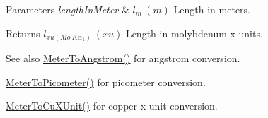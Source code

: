 \begin{DoxyParams}{Parameters}
{\em length\+In\+Meter} & $ l_{m}\ (m)$ Length in meters. \\
\hline
\end{DoxyParams}
\begin{DoxyReturn}{Returns}
$ l_{xu(Mo\ K\alpha_1)}\ (xu)$ Length in molybdenum x units. 
\end{DoxyReturn}
\begin{DoxySeeAlso}{See also}
\mbox{\hyperlink{group___e_g_x_math-_conversions-_length_conversions-_s_i-_meter-_non-_s_i_ga9e6d5040f58d167bd7a4b6cebb5527ee}{Meter\+To\+Angstrom()}} for angstrom conversion. 

\mbox{\hyperlink{group___e_g_x_math-_conversions-_length_conversions-_s_i-_meter-_s_i_ga5e136454c20254062d6e8637cfbfb8ee}{Meter\+To\+Picometer()}} for picometer conversion. 

\mbox{\hyperlink{group___e_g_x_math-_conversions-_length_conversions-_s_i-_meter-_non-_s_i_ga67cec26b74704753fc51a8f4db27a4b4}{Meter\+To\+Cu\+X\+Unit()}} for copper x unit conversion. 
\end{DoxySeeAlso}

